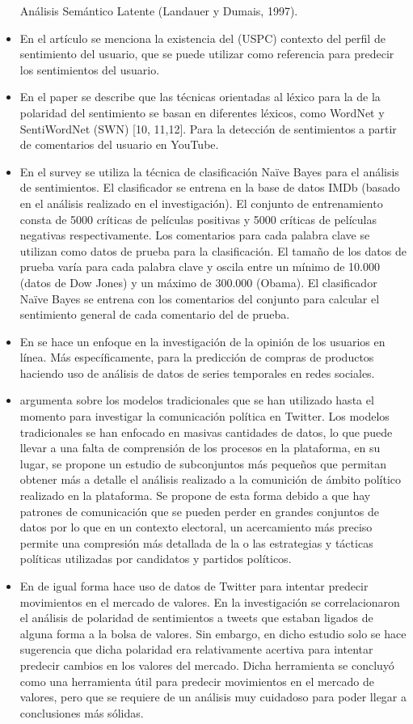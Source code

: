 \documentclass[12pt, conference]{IEEEtran}
\begin{document}
\begin{itemize}
 Análisis Semántico Latente (Landauer y Dumais, 1997).
 \item En el artículo \cite{r7} se menciona la existencia del (USPC) contexto del perfil de sentimiento
 del usuario, que se puede utilizar como referencia para predecir los sentimientos del usuario.
 \item En el paper \cite{r8}  se describe que las técnicas orientadas al léxico para la
 de la polaridad del sentimiento se basan en 
 diferentes léxicos, como WordNet y
 SentiWordNet (SWN) [10, 11,12]. Para la detección de sentimientos a partir de comentarios del usuario en YouTube.
 \item En el survey \cite{r9} se utiliza la técnica de clasificación Naïve Bayes para el análisis de sentimientos. El clasificador se entrena en la
 base de datos IMDb (basado en el análisis realizado en el
 investigación). El conjunto de entrenamiento consta de 5000 críticas de películas positivas y
 5000 críticas de películas negativas respectivamente. Los comentarios
 para cada palabra clave se utilizan como datos de prueba para la clasificación. El tamaño de los datos de prueba varía para cada palabra clave y oscila entre un mínimo de 10.000 (datos de Dow Jones) y un máximo de 300.000 (Obama). El clasificador Naïve Bayes se entrena con los comentarios del conjunto
 para calcular el sentimiento general de cada comentario del
 de prueba.
 \item En \cite{r19} se hace un enfoque en la investigación de la opinión de los usuarios en línea. Más específicamente, para la predicción de compras de productos haciendo uso de análisis de datos de series temporales en redes sociales.
 \item \cite{r18} argumenta sobre los modelos tradicionales que se han utilizado hasta el momento para investigar la comunicación política en Twitter. Los modelos tradicionales se han enfocado en masivas cantidades de datos, lo que puede llevar a una falta de comprensión de los procesos en la plataforma, en su lugar, se propone un estudio de subconjuntos más pequeños que permitan obtener más a detalle el análisis realizado a la comunición de ámbito político realizado en la plataforma. Se propone de esta forma debido a que hay patrones de comunicación que se pueden perder en grandes conjuntos de datos por lo que en un contexto electoral, un acercamiento más preciso permite una compresión más detallada de la o las estrategias y tácticas políticas utilizadas por candidatos y partidos políticos.
 \item En \cite{r17} de igual forma hace uso de datos de Twitter para intentar predecir movimientos en el mercado de valores. En la investigación se correlacionaron el análisis de polaridad de sentimientos a tweets que estaban ligados de alguna forma a la bolsa de valores. Sin embargo, en dicho estudio solo se hace sugerencia que dicha polaridad era relativamente acertiva para intentar predecir cambios en los valores del mercado. Dicha herramienta se concluyó como una herramienta útil para predecir movimientos en el mercado de valores, pero que se requiere de un análisis muy cuidadoso para poder llegar a conclusiones más sólidas.

\end{itemize}
\end{document}

